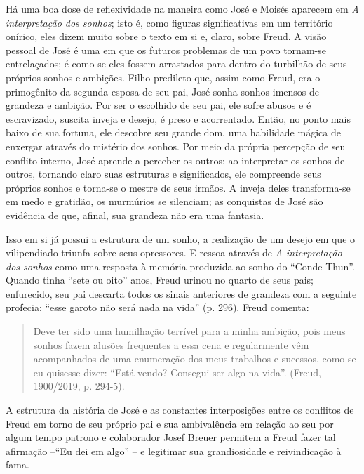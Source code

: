Há uma boa dose de reflexividade na maneira como José e Moisés aparecem
em \emph{A interpretação dos sonhos}; isto é, como figuras
significativas em um território onírico, eles dizem muito sobre o texto
em si e, claro, sobre Freud. A visão pessoal de José é uma em que os
futuros problemas de um povo tornam-se entrelaçados; é como se eles
fossem arrastados para dentro do turbilhão de seus próprios sonhos e
ambições. Filho predileto que, assim como Freud, era o primogênito da
segunda esposa de seu pai, José sonha sonhos imensos de grandeza e
ambição. Por ser o escolhido de seu pai, ele sofre abusos e é
escravizado, suscita inveja e desejo, é preso e acorrentado. Então, no
ponto mais baixo de sua fortuna, ele descobre seu grande dom, uma
habilidade mágica de enxergar através do mistério dos sonhos. Por meio
da própria percepção de seu conflito interno, José aprende a perceber os
outros; ao interpretar os sonhos de outros, tornando claro suas
estruturas e significados, ele compreende seus próprios sonhos e
torna-se o mestre de seus irmãos. A inveja deles transforma-se em medo e
gratidão, os murmúrios se silenciam; as conquistas de José são evidência
de que, afinal, sua grandeza não era uma fantasia.

Isso em si já possui a estrutura de um sonho, a realização de um desejo
em que o vilipendiado triunfa sobre seus opressores. E ressoa através de
\emph{A interpretação dos sonhos} como uma resposta à memória produzida
ao sonho do ``Conde Thun''. Quando tinha ``sete ou oito'' anos, Freud
urinou no quarto de seus pais; enfurecido, seu pai descarta todos os
sinais anteriores de grandeza com a seguinte profecia: ``esse garoto não
será nada na vida'' (p. 296). Freud comenta:

\begin{quote}
Deve ter sido uma humilhação terrível para a minha ambição, pois meus
sonhos fazem alusões frequentes a essa cena e regularmente vêm
acompanhados de uma enumeração dos meus trabalhos e sucessos, como se eu
quisesse dizer: ``Está vendo? Consegui ser algo na vida''. (Freud,
1900/2019, p. 294-5).
\end{quote}

A estrutura da história de José e as constantes interposições entre os
conflitos de Freud em torno de seu próprio pai e sua ambivalência em
relação ao seu por algum tempo patrono e colaborador Josef Breuer
permitem a Freud fazer tal afirmação --``Eu dei em algo'' -- e legitimar
sua grandiosidade e reivindicação à fama.

